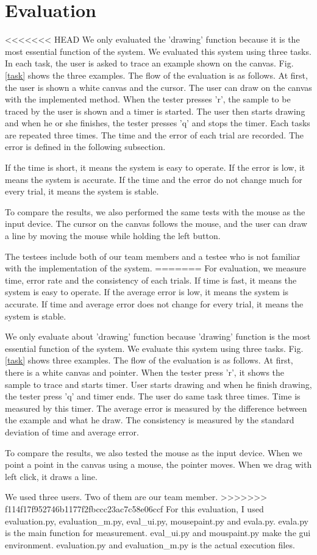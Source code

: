 \clearpage
\section{Evaluation}
<<<<<<< HEAD
We only evaluated the 'drawing' function because it is the most essential function of the system.
We evaluated this system using three tasks. In each task, the user is asked to trace an example shown on the canvas. Fig. \ref{task} shows the three examples.
The flow of the evaluation is as follows. At first, the user is shown a white canvas and the cursor. The user can draw on the canvas with the implemented method. 
When the tester presses 'r', the sample to be traced by the user is shown and a timer is started.
The user then starts drawing and when he or she finishes, the tester presses 'q' and stops the timer.
Each tasks are repeated three times. The time and the error of each trial are recorded. The error is defined in the following subsection. 

If the time is short, it means the system is easy to operate.
If the error is low, it means the system is accurate.
If the time and the error do not change much for every trial, it means the system is stable.
\par  
To compare the results, we also performed the same tests with the mouse as the input device. The cursor on the canvas follows the mouse, and the user can draw a line by moving the mouse while holding the left button. 

The testees include both of our team members and a testee who is not familiar with the implementation of the system. 
=======
For evaluation, we measure time, error rate and the consistency of each trials.
If time is fast, it means the system is easy to operate.
If the average error is low, it means the system is accurate.
If time and average error does not change for every trial, it means the system is stable.
\par
We only evaluate about 'drawing' function because 'drawing' function is the most essential function of the system.
We evaluate this system using three tasks. Fig. \ref{task} shows three examples.
The flow of the evaluation is as follows. At first, there is a white canvas and pointer.
When the tester press 'r', it shows the sample to trace and starts timer.
User starts drawing and when he finish drawing, the tester press 'q' and timer ends.
The user do same task three times.
Time is measured by this timer. The average error is measured by the difference between the example and what he draw. The consistency is measured by the standard deviation of time and average error.
\par
To compare the results, we also tested the mouse as the input device. When we point a point in the canvas using a mouse, the pointer moves. When we drag with left click, it draws a line.\par
We used three users. Two of them are our team member.
>>>>>>> f114f17f952746b1177f2fbccc23ac7c58e06ccf
For this evaluation, I used evaluation.py, evaluation\_m.py, eval\_ui.py, mousepaint.py and evala.py.
evala.py is the main function for measurement. eval\_ui.py and mouspaint.py make the gui environment. evaluation.py and evaluation\_m.py is the actual execution files.
